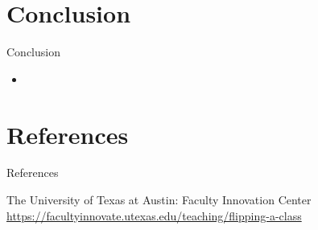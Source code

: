 \documentclass[xcolor=table]{beamer}
\begin{document}

\section{Conclusion}

\begin{frame}{Conclusion}
	\begin{itemize}
		\item 
	\end{itemize}
\end{frame}

%
%  
%  



\section*{References}

\begin{frame}[allowframebreaks]{References}
    
  \begin{thebibliography}{10}

  	The University of Texas at Austin: \small
  	Faculty Innovation Center
    \newblock  \small \url{https://facultyinnovate.utexas.edu/teaching/flipping-a-class}
 
  \end{thebibliography}
\end{frame}
\end{document}
